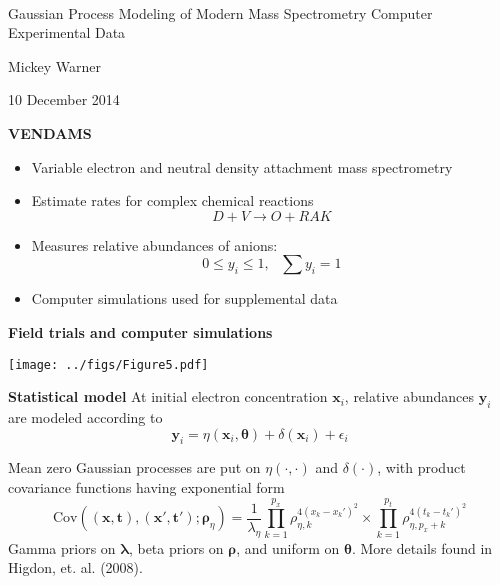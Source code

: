 \documentclass[mathserif, 11pt, t]{beamer}
\newcommand{\lra}{\longrightarrow}
\newcommand{\m}[1]{\mathbf{\bm{#1}}}
\renewcommand{\subtitle}[1]{\vspace{0.45cm}\textcolor{bluegreen}{
    {\textbf{#1}}}\vspace{0.15cm}\newline}
\begin{document}
\begin{center}
\ \\ [-0.5in]
\vfill
\bigskip
\bigskip
\bigskip
\bigskip
\bigskip

\begin{LARGE}
\begin{center}
Gaussian Process Modeling of Modern Mass Spectrometry Computer Experimental Data
\end{center}
\end{LARGE}
\vfill

\begin{center}
Mickey Warner
\end{center}
\vfill
10 December 2014
\bigskip
\bigskip
\bigskip
\vfill
\ \\ [-0.5in]
\end{center}

\begin{frame}
\subtitle{VENDAMS}
\begin{itemize}[label={$\cdot$}]
\item Variable electron and neutral density attachment mass spectrometry
\smallskip
\item Estimate rates for complex chemical reactions \[D+V\lra O+RAK\]
\item Measures relative abundances of anions: \[0\leq y_i \leq 1,~~~\sum y_i=1\]
\item Computer simulations used for supplemental data
\end{itemize}
\end{frame}

\begin{frame}
\subtitle{Field trials and computer simulations}
\begin{center}
\texttt{[image: ../figs/Figure5.pdf]}
\end{center}
\end{frame}

\begin{frame}
\subtitle{Statistical model}
At initial electron concentration $\m{x}_i$, relative abundances $\m{y}_i$ are modeled according to
\[\m{y}_i = \eta(\m{x}_i, \m{\theta}) + \delta(\m{x}_i) + \epsilon_i\]

Mean zero Gaussian processes are put on $\eta(\cdot, \cdot)$ and $\delta(\cdot)$, with product covariance functions having exponential form
\[ \mathrm{Cov}((\m{x},\m{t}),(\m{x}',\m{t}'); \m{\rho}_\eta) = \frac{1}{\lambda_\eta}\prod_{k=1}^{p_x}\rho_{\eta,k}^{4(x_k-x_k')^2}\times\prod_{k=1}^{p_t}\rho_{\eta,p_x+k}^{4(t_k-t_k')^2} \]
Gamma priors on $\m{\lambda}$, beta priors on $\m{\rho}$, and uniform on $\m{\theta}$. More details found in Higdon, et. al. (2008).
\end{frame}
\end{document}
